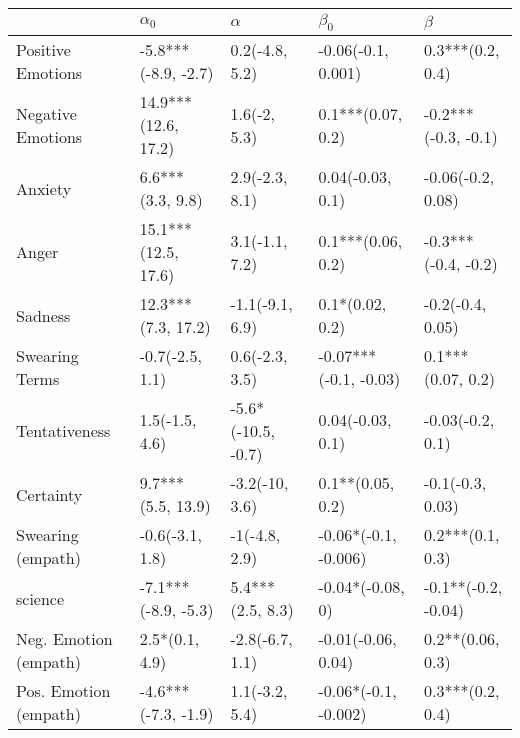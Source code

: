 \begin{tabular}{lllll}
\toprule
{} &           $\alpha_0$ &            $\alpha$ &              $\beta_0$ &              $\beta$ \\
\midrule
Positive Emotions     &  -5.8***(-8.9, -2.7) &      0.2(-4.8, 5.2) &     -0.06(-0.1, 0.001) &     0.3***(0.2, 0.4) \\
Negative Emotions     &  14.9***(12.6, 17.2) &        1.6(-2, 5.3) &      0.1***(0.07, 0.2) &  -0.2***(-0.3, -0.1) \\
Anxiety               &     6.6***(3.3, 9.8) &      2.9(-2.3, 8.1) &       0.04(-0.03, 0.1) &    -0.06(-0.2, 0.08) \\
Anger                 &  15.1***(12.5, 17.6) &      3.1(-1.1, 7.2) &      0.1***(0.06, 0.2) &  -0.3***(-0.4, -0.2) \\
Sadness               &   12.3***(7.3, 17.2) &     -1.1(-9.1, 6.9) &        0.1*(0.02, 0.2) &     -0.2(-0.4, 0.05) \\
Swearing Terms        &      -0.7(-2.5, 1.1) &      0.6(-2.3, 3.5) &  -0.07***(-0.1, -0.03) &    0.1***(0.07, 0.2) \\
Tentativeness         &       1.5(-1.5, 4.6) &  -5.6*(-10.5, -0.7) &       0.04(-0.03, 0.1) &     -0.03(-0.2, 0.1) \\
Certainty             &    9.7***(5.5, 13.9) &      -3.2(-10, 3.6) &       0.1**(0.05, 0.2) &     -0.1(-0.3, 0.03) \\
Swearing (empath)     &      -0.6(-3.1, 1.8) &       -1(-4.8, 2.9) &   -0.06*(-0.1, -0.006) &     0.2***(0.1, 0.3) \\
science               &  -7.1***(-8.9, -5.3) &    5.4***(2.5, 8.3) &       -0.04*(-0.08, 0) &  -0.1**(-0.2, -0.04) \\
Neg. Emotion (empath) &       2.5*(0.1, 4.9) &     -2.8(-6.7, 1.1) &     -0.01(-0.06, 0.04) &     0.2**(0.06, 0.3) \\
Pos. Emotion (empath) &  -4.6***(-7.3, -1.9) &      1.1(-3.2, 5.4) &   -0.06*(-0.1, -0.002) &     0.3***(0.2, 0.4) \\
\bottomrule
\end{tabular}
